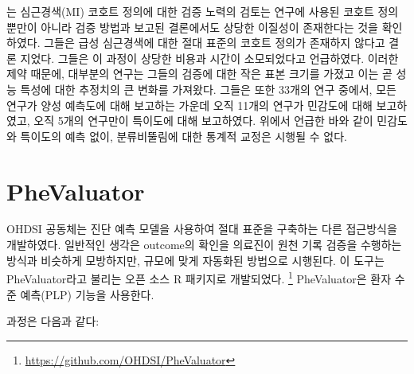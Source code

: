 \documentclass[10.5pt]{book}
\let\rmarkdownfootnote\footnote%
\def\footnote{\protect\rmarkdownfootnote}
\theoremstyle{definition}
\theoremstyle{definition}
\theoremstyle{definition}
\theoremstyle{remark}
\begin{document}
\citet{Rubbo2015phenotypes} 는 심근경색(MI) 코호트 정의에 대한 검증
노력의 검토는 연구에 사용된 코호트 정의뿐만이 아니라 검증 방법과 보고된
결론에서도 상당한 이질성이 존재한다는 것을 확인하였다. 그들은 급성
심근경색에 대한 절대 표준의 코호트 정의가 존재하지 않다고 결론 지었다.
그들은 이 과정이 상당한 비용과 시간이 소모되었다고 언급하였다. 이러한
제약 때문에, 대부분의 연구는 그들의 검증에 대한 작은 표본 크기를 가졌고
이는 곧 성능 특성에 대한 추정치의 큰 변화를 가져왔다. 그들은 또한 33개의
연구 중에서, 모든 연구가 양성 예측도에 대해 보고하는 가운데 오직 11개의
연구가 민감도에 대해 보고하였고, 오직 5개의 연구만이 특이도에 대해
보고하였다. 위에서 언급한 바와 같이 민감도와 특이도의 예측 없이,
분류비뚤림에 대한 통계적 교정은 시행될 수 없다.

\section{PheValuator}\label{phevaluator}


OHDSI 공동체는 진단 예측 모델을 사용하여 절대 표준을 구축하는 다른
접근방식을 개발하였다. \citep{Swerdel2019phevaluator} 일반적인 생각은
outcome의 확인을 의료진이 원천 기록 검증을 수행하는 방식과 비슷하게
모방하지만, 규모에 맞게 자동화된 방법으로 시행된다. 이 도구는
PheValuator라고 불리는 오픈 소스 R 패키지로 개발되었다. \footnote{\url{https://github.com/OHDSI/PheValuator}}
PheValuator은 환자 수준 예측(PLP) 기능을 사용한다.

과정은 다음과 같다:
\end{document}
